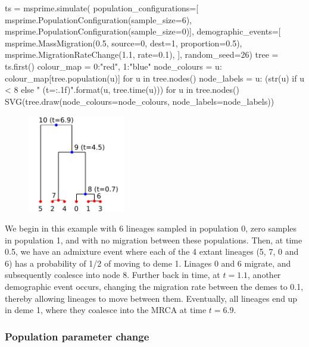 \documentclass[graybox]{svmult}
\newcommand{\includenbimage}[1]{\begin{center}\texttt{[image: \#1]}\end{center}}
\begin{document}
\begin{pythoncode}
ts  = msprime.simulate(
    population_configurations=[
        msprime.PopulationConfiguration(sample_size=6),
        msprime.PopulationConfiguration(sample_size=0)],
    demographic_events=[
        msprime.MassMigration(0.5, source=0, dest=1, proportion=0.5),
        msprime.MigrationRateChange(1.1, rate=0.1),
    ],
    random_seed=26)
tree = ts.first()
colour_map = {0:"red", 1:"blue"}
node_colours = {u: colour_map[tree.population(u)] for u in tree.nodes()}
node_labels = {
    u: (str(u) if u < 8 else "{} (t={:.1f})".format(u, tree.time(u)))
    for u in tree.nodes()}
SVG(tree.draw(node_colours=node_colours, node_labels=node_labels))
\end{pythoncode}

\begin{figure}
  \begin{center}
    \includegraphics[width=0.38\textwidth]{images/simulations_39_0.pdf}
  \end{center}
\end{figure}

    We begin in this example with 6 lineages sampled in population 0, zero
samples in population 1, and with no migration between these
populations. Then, at time 0.5, we have an admixture event where each of
the 4 extant lineages (5, 7, 0 and 6) has a probability of 1/2 of moving
to deme 1. Linages 0 and 6 migrate, and subsequently coalesce into node
8. Further back in time, at \(t=1.1\), another demographic event occurs,
changing the migration rate between the demes to 0.1, thereby allowing
lineages to move between them. Eventually, all lineages end up in deme
1, where they coalesce into the MRCA at time \(t=6.9\).

\subsubsection{Population parameter change}\label{population-parameter-change}
\end{document}
